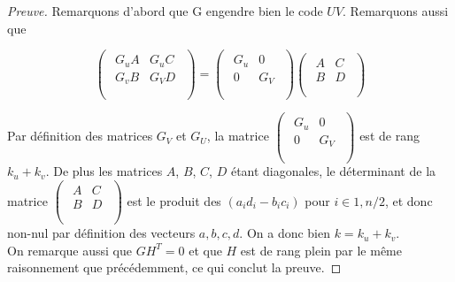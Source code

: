 \documentclass[12pt]{article}
\theoremstyle{plain}
\begin{document}
\begin{proof}[Preuve]
Remarquons d'abord que G engendre bien le code $UV$. Remarquons aussi que 

$$
\begin{pmatrix}
\begin{array}{c|c}
G_uA & G_uC \\
 \hline 
G_vB & G_VD \\
\end{array} \\
\end{pmatrix}
= 
\begin{pmatrix}
\begin{array}{c|c}
G_u & 0 \\
 \hline 
0 & G_V \\
\end{array} \\
\end{pmatrix} 
\begin{pmatrix}
\begin{array}{c|c}
A & C \\
 \hline 
B & D \\
\end{array} \\
\end{pmatrix}
$$

Par définition des matrices $G_V$ et $G_U$, la matrice $ 
\begin{pmatrix}
\begin{array}{c|c}
G_u & 0 \\
 \hline 
0 & G_V \\
\end{array} \\
\end{pmatrix} $ est de rang $k_u + k_v$. De plus les matrices $A$, $B$, $C$, $D$ étant diagonales, le déterminant de la matrice $\begin{pmatrix}
\begin{array}{c|c}
A & C \\
 \hline 
B & D \\
\end{array} \\
\end{pmatrix}$
est le produit des $(a_id_i - b_ic_i)$ pour $i \in {1, n/2}$, et donc non-nul par définition des vecteurs $a,b,c,d$. On a donc bien $k = k_u + k_v$. \\
On remarque aussi que $GH^T = 0$ et que $H$ est de rang plein par le même raisonnement que précédemment, ce qui conclut la preuve.
\end{proof}
\end{document}
